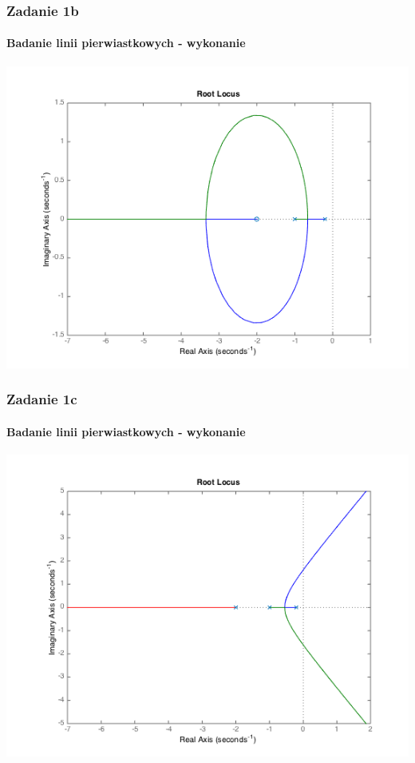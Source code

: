 \documentclass{beamer}
\begin{document}
\begin{frame}\frametitle{Zadanie 1b}\framesubtitle{Badanie linii pierwiastkowych - wykonanie}
	
	\centering	\includegraphics[scale=0.45]{zadanie1_b.png}
	
\end{frame}

\begin{frame}\frametitle{Zadanie 1c}\framesubtitle{Badanie linii pierwiastkowych - wykonanie}
	
	\centering	\includegraphics[scale=0.45]{zadanie1_c1.png}
	
\end{frame}
\end{document}
